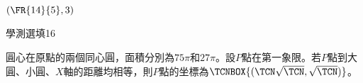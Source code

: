 \begin{QUESTIONS}
\begin{QUESTION}
\begin{QANS}
            $(\FR{14}{5}, 3)$
        \end{QANS}
        \begin{QSOLLIST}
        \end{QSOLLIST}
        \begin{QEMPTYSPACE}
        \end{QEMPTYSPACE}
    \end{QUESTION}
    \begin{QUESTION}
        \begin{ExamInfo}{85}{學測}{選填}{16}
        \end{ExamInfo}
        \begin{ExamAnsRateInfo}{}{}{}{}
        \end{ExamAnsRateInfo}
        \begin{QBODY}
             
           圓心在原點的兩個同心圓，面積分別為$75\pi $和$27\pi $。設$P$點在第一象限。若$P$點到大圓、小圓、$X$軸的距離均相等，則$P$點的坐標為$\TCNBOX{(\TCN\sqrt{\TCN}, \sqrt{\TCN})}$。
            

\end{QBODY}
\end{QUESTION}
\end{QUESTIONS}
